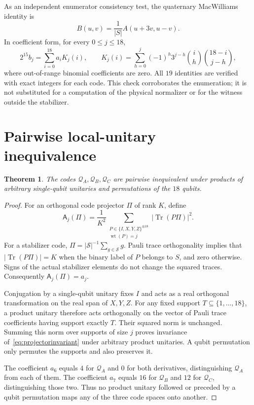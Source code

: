 \documentclass[11pt,a4paper]{article}
\newtheorem{theorem}{Theorem}
\newcommand{\wt}{\operatorname{wt}}
\newcommand{\Tr}{\operatorname{Tr}}
\newcommand{\CA}{\mathcal Q_A}
\newcommand{\CB}{\mathcal Q_B}
\newcommand{\CC}{\mathcal Q_C}
\begin{document}
As an independent enumerator consistency test, the quaternary MacWilliams identity is
\begin{equation}\label{eq:macwilliams}
 B(u,v)=\frac1{|S|}A(u+3v,u-v).
\end{equation}
In coefficient form, for every $0\le j\le18$,
\begin{equation}\label{eq:krawtchouk}
 2^{15}b_j=\sum_{i=0}^{18}a_iK_j(i),\qquad
 K_j(i)=\sum_{h=0}^j(-1)^h3^{j-h}\binom{i}{h}\binom{18-i}{j-h},
\end{equation}
where out-of-range binomial coefficients are zero. All $19$ identities are verified with exact integers for each code. This check corroborates the enumeration; it is not substituted for a computation of the physical normalizer or for the witness outside the stabilizer.

\section{Pairwise local-unitary inequivalence}\label{sec:inequivalence}
\begin{theorem}\label{thm:inequivalence}
The codes $\CA,\CB,\CC$ are pairwise inequivalent under products of arbitrary single-qubit unitaries and permutations of the $18$ qubits.
\end{theorem}
\begin{proof}
For an orthogonal code projector $\Pi$ of rank $K$, define
\begin{equation}\label{eq:projectorinvariant}
 \mathsf A_j(\Pi)=\frac1{K^2}\sum_{\substack{P\in\{I,X,Y,Z\}^{\otimes18}\\\wt(P)=j}}
 |\Tr(P\Pi)|^2.
\end{equation}
For a stabilizer code, $\Pi=|\mathcal S|^{-1}\sum_{g\in\mathcal S}g$. Pauli trace orthogonality implies that $|\Tr(P\Pi)|=K$ when the binary label of $P$ belongs to $S$, and zero otherwise. Signs of the actual stabilizer elements do not change the squared traces. Consequently $\mathsf A_j(\Pi)=a_j$.

Conjugation by a single-qubit unitary fixes $I$ and acts as a real orthogonal transformation on the real span of $X,Y,Z$. For any fixed support $T\subseteq\{1,\ldots,18\}$, a product unitary therefore acts orthogonally on the vector of Pauli trace coefficients having support exactly $T$. Their squared norm is unchanged. Summing this norm over supports of size $j$ proves invariance of~\eqref{eq:projectorinvariant} under arbitrary product unitaries. A qubit permutation only permutes the supports and also preserves it.

The coefficient $a_6$ equals $4$ for $\CA$ and $0$ for both derivatives, distinguishing $\CA$ from each of them. The coefficient $a_7$ equals $16$ for $\CB$ and $12$ for $\CC$, distinguishing those two. Thus no product unitary followed or preceded by a qubit permutation maps any of the three code spaces onto another.
\end{proof}
\end{document}
